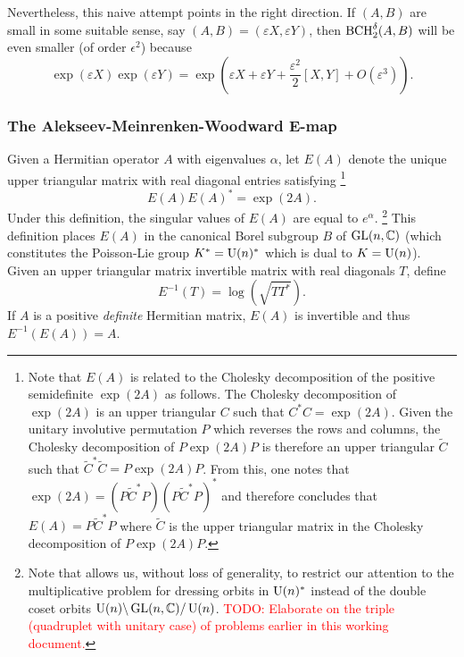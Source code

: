 \documentclass[notitlepage]{article}
\begin{document}
Nevertheless, this naive attempt points in the right direction.
If $(A,B)$ are small in some suitable sense, say $(A,B) = (\varepsilon X, \varepsilon Y)$, then $\operatorname{BCH}_2^{\delta}(A,B)$ will be even smaller (of order $\epsilon^2$) because
\begin{equation}
    \exp(\varepsilon X)\exp(\varepsilon Y) = \exp(\varepsilon X + \varepsilon Y + \frac{\varepsilon^2}{2}[X,Y] + O(\varepsilon^3)).
\end{equation}

\subsubsection{The Alekseev-Meinrenken-Woodward \texorpdfstring{$\boldsymbol{E}$}{E}-map}
Given a Hermitian operator $A$ with eigenvalues $\alpha$, let $E(A)$ denote the unique upper triangular matrix with real diagonal entries satisfying%
\footnote{
    Note that $E(A)$ is related to the Cholesky decomposition of the positive semidefinite $\exp(2A)$ as follows.
    The Cholesky decomposition of $\exp(2A)$ is an upper triangular $C$ such that $C^{*}C = \exp(2A)$.
    Given the unitary involutive permutation $P$ which reverses the rows and columns,
    the Cholesky decomposition of $P\exp(2A)P$ is therefore an upper triangular $\tilde C$ such that $\tilde C^{*}\tilde C = P\exp(2A)P$.
    From this, one notes that $\exp(2A) = (P \tilde C^{*} P) (P \tilde C^{*} P)^{*}$ and therefore concludes that $E(A) = P \tilde C^{*} P$ where $\tilde C$ is the upper triangular matrix in the Cholesky decomposition of $P\exp(2A)P$.
}
\begin{equation}
    E(A) E(A)^{*} = \exp(2A).
\end{equation}
Under this definition, the singular values of $E(A)$ are equal to $e^{\alpha}$.
\footnote{
    Note that \cite[Lemma 4.1]{alekseev2001linearization} allows us, without loss of generality, to restrict our attention to the multiplicative problem for dressing orbits in $\operatorname{U}(n)^{*}$ instead of the double coset orbits $\operatorname{U}(n) \backslash \operatorname{GL}(n,\mathbb C) / \operatorname{U}(n)$.
    \textcolor{red}{TODO: Elaborate on the triple (quadruplet with unitary case) of problems earlier in this working document.}
}
This definition places $E(A)$ in the canonical Borel subgroup $B$ of $\operatorname{GL}(n, \mathbb C)$ (which constitutes the Poisson-Lie group $K^{*} = \operatorname{U}(n)^{*}$ which is dual to $K = \operatorname{U}(n)$).
Given an upper triangular matrix invertible matrix with real diagonals $T$, define 
\begin{equation}
    E^{-1}(T) = \log(\sqrt{T T^{*}}).
\end{equation}
If $A$ is a positive \textit{definite} Hermitian matrix, $E(A)$ is invertible and thus $E^{-1}(E(A)) = A$.
\end{document}

